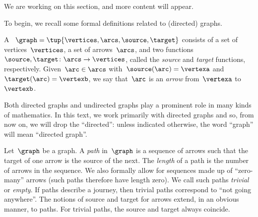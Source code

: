 

\section{}

We are working on this section, and more content will appear.

To begin, we recall some formal definitions related to (directed) graphs.


\begin{definition}[Graph]
    \label{def:Graph}
    A \emph{}~$\graph=\tup{\vertices,\arcs, \source,\target}$ consists of a set of vertices~$\vertices$, a set of arrows~$\arcs$, and two functions~$\source,\target \colon \arcs \to \vertices$, called the \emph{source} and \emph{target} functions, respectively.
    Given~$\arc\in \arcs$ with~$\source(\arc)=\vertexa$ and~$\target(\arc)=\vertexb$, we say that~$\arc$ is an \emph{arrow} from~$\vertexa$ to~$\vertexb$.
\end{definition}

\begin{remark}
    Both directed graphs and undirected graphs play a prominent role in many kinds of mathematics.
    In this text, we work primarily with directed graphs and so, from now on, we will drop the ``directed'': unless indicated otherwise, the word ``graph'' will mean ``directed graph''.
\end{remark}

\begin{definition}[Path]
    \label{def:path}
    Let~$\graph$ be a graph. A \emph{path} in~$\graph$ is a sequence of arrows such that the target of one arrow is the source of the next.
    The \emph{length} of a path is the number of arrows in the sequence.
    We also formally allow for sequences made up of ``zero-many'' arrows (such paths therefore have length zero).
    We call such paths \emph{trivial} or \emph{empty}. If paths describe a journey, then trivial paths correspond to ``not going anywhere''.
    The notions of source and target for arrows extend, in an obvious manner, to paths.
    For trivial paths, the source and target always coincide.
\end{definition}
